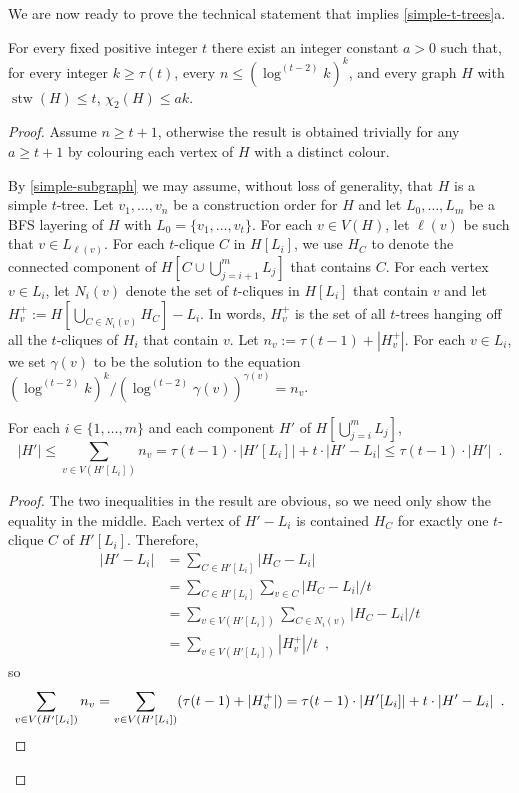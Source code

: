 \documentclass[kpfonts]{patmorin}
\DeclareMathOperator{\stw}{stw}
\newcommand{\trn}{\chi_2}
\theoremstyle{named}
\newcommand{\weirdref}[2]{\cref{#1}#2}
\begin{document}
We are now ready to prove the technical statement that implies \weirdref{simple-t-trees}{a}.

\begin{lem}\label{two-tree-technical}
    For every fixed positive integer $t$ there exist an integer constant $a>0$ such that, for every integer $k\ge \tau(t)$, every $n\le (\log^{(t-2)} k)^{k}$, and every graph $H$ with $\stw(H)\le t$, $\trn(H)\le ak$.
\end{lem}

\begin{proof}
    Assume $n\ge t+1$, otherwise the result is obtained trivially for any $a\ge t+1$ by colouring each vertex of $H$ with a distinct colour.

    By \cref{simple-subgraph} we may assume, without loss of generality, that $H$ is a simple $t$-tree.  Let $v_1,\ldots,v_n$ be a construction order for $H$ and let $L_0,\ldots,L_m$ be a BFS layering of $H$ with $L_0=\{v_1,\ldots,v_{t}\}$. For each $v\in V(H)$, let $\ell(v)$ be such that $v\in L_{\ell(v)}$. For each $t$-clique $C$ in $H[L_i]$, we use $H_C$ to denote the connected component of $H[C\cup\bigcup_{j=i+1}^m L_j]$ that contains $C$. For each vertex $v\in L_i$, let $N_i(v)$ denote the set of $t$-cliques in $H[L_i]$ that contain $v$ and let $H^+_v:=H[\bigcup_{C\in N_i(v)} H_C]-L_i$.  In words, $H^+_v$ is the set of all $t$-trees hanging off all the $t$-cliques of $H_i$ that contain $v$.  Let $n_v:=\tau(t-1)+|H^+_v|$.  For each $v\in L_i$, we set $\gamma(v)$ to be the solution to the equation $(\log^{(t-2)} k)^k/(\log^{(t-2)} \gamma(v))^{\gamma(v)} = n_v$.

    \begin{clm}\label{size-claim}
        For each $i\in\{1,\ldots,m\}$ and each component $H'$ of $H[\bigcup_{j=i}^m L_j]$,
        \[
            |H'| \le \sum_{v\in V(H'[L_i])} n_v = \tau(t-1)\cdot|H'[L_i] |+ t\cdot|H'-L_i|
            \le \tau(t-1)\cdot|H'| \enspace .
        \]
    \end{clm}

    \begin{proof}
        The two inequalities in the result are obvious, so we need only show the equality in the middle.
        Each vertex of $H'-L_i$ is contained $H_C$ for exactly one $t$-clique $C$ of $H'[L_i]$.  Therefore,
        \begin{align*}
            |H'-L_i|
            & = \sum_{C\in H'[L_i]} |H_C-L_i| \\
            & = \sum_{C\in H'[L_i]}\sum_{v\in C} |H_C-L_i|/t \\
            & = \sum_{v\in V(H'[L_i])}\sum_{C\in N_i(v)} |H_C-L_i|/t \\
            & = \sum_{v\in V(H'[L_i])}|H^+_v|/t \enspace ,
        \end{align*}
        so
        \[  \sum_{v\in V(H'[L_i])} n_v = \sum_{v\in V(H'[L_i])}(\tau(t-1)+|H^+_v|)
          = \tau(t-1)\cdot|H'[L_i]| + t\cdot|H'-L_i| \enspace . \qedhere
        \]
    \end{proof}


\end{proof}
\end{document}
